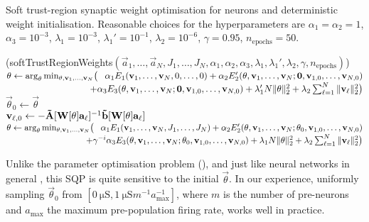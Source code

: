 \begin{algorithm}[t]
	\begin{minipage}{0.98\textwidth}
	\caption[Soft trust-region synaptic weight optimisation for $n$-LIF neurons]{Soft trust-region synaptic weight optimisation for \nlif neurons and deterministic weight initialisation.
	Reasonable choices for the hyperparameters are
	$\alpha_1 = \alpha_2 = 1$, $\alpha_3 = 10^{-3}$, $\lambda_1 = 10^{-3}$, $\lambda_1' = 10^{-1}$, $\lambda_2 = 10^{-6}$, $\gamma = 0.95$, $n_\mathrm{epochs} = 50$.
	}
	\label{alg:nlif_tr_weights}
	\end{minipage}
	\sffamily\small
	\Begin(softTrustRegionWeights${(\vec a_1, \ldots, \vec a_N, J_1, \ldots, J_N, \alpha_1, \alpha_2, \alpha_3, \lambda_1, \lambda_1', \lambda_2, \gamma, n_\mathrm{epochs})}$)
	{
		$\vec \theta \gets
			\arg_{\vec \theta}\min_{\vec \theta, \vec v_1, \ldots, \vec v_N}
				\bigl( \hphantom{+} \alpha_1 E_1(\vec v_1, \ldots, \vec v_{N}, 0, \ldots, 0)
			+ \alpha_2 E_2'(\vec \theta, \vec v_1, \ldots, \vec v_N; \vec 0, \vec v_{1,0}, \ldots, \vec v_{N, 0})$ \\
		$\hspace{9.15em} + \alpha_3 E_3(\vec \theta, \vec v_1, \ldots, \vec v_N; \vec 0, \vec v_{1,0}, \ldots, \vec v_{N, 0}) + \lambda'_1 N \|\vec \theta\|_2^2 + \lambda_2 \sum_{\ell = 1}^N \| \vec v_{\ell} \|_2^2 \bigr)$ \\
		{
			$\vec \theta_0 \gets \vec \theta$ \\
			{
				$\vec v_{\ell, 0} \gets -\mrA[\mat W[\vec \theta] \vec a_\ell]^{-1} \vrb[\mat W[\vec \theta] \vec a_\ell]$
			}
			$\vec \theta \gets
				\arg_{\vec \theta}\min_{\vec \theta, \vec v_1, \ldots, \vec v_N}
					\bigl( \hphantom{+} \alpha_1 E_1(\vec v_1, \ldots, \vec v_{N}, J_1, \ldots, J_N)
				+ \alpha_2 E_2'(\vec \theta, \vec v_1, \ldots, \vec v_N; \vec \theta_0, \vec v_{1,0}, \ldots, \vec v_{N, 0})$ \\
			$\hspace{9.15em} + \gamma^{-i} \alpha_3 E_3(\vec \theta, \vec v_1, \ldots, \vec v_N; \vec \theta_0, \vec v_{1,0}, \ldots, \vec v_{N, 0}) + \lambda_1 N \|\vec \theta\|_2^2 + \lambda_2 \sum_{\ell = 1}^N \| \vec v_{\ell} \|_2^2 \bigr)$
		}
		\Return{$\vec \theta$}
	}
\end{algorithm}


Unlike the parameter optimisation problem (), and just like neural networks in general \citep[cf.~][]{sutskever2013importance,he2015delving}, this SQP is quite sensitive to the initial $\vec \theta$.
In our experience, uniformly sampling $\vec \theta_0$ from $[\SI{0}{\micro\siemens}, \SI{1}{\micro\siemens} m^{-1} a_\mathrm{max}^{-1}]$, where $m$ is the number of pre-neurons and $a_\mathrm{max}$ the maximum pre-population firing rate, works well in practice.

